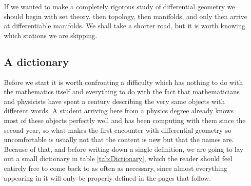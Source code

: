     If we wanted to make a completely rigorous study of differential geometry we should begin with set theory, then topology, then manifolds, and only then arrive at differentiable manifolds. We shall take a shorter road, but it is worth knowing which stations we are skipping.

    \subsection{A dictionary}

        Before we start it is worth confronting a difficulty which has nothing to do with the mathematics itself and everything to do with the fact that mathematicians and physicists have spent a century describing the very same objects with different words. A student arriving here from a physics degree already knows most of these objects perfectly well and has been computing with them since the second year, so what makes the first encounter with differential geometry so uncomfortable is usually not that the content is new but that the names are. Because of that, and before writing down a single definition, we are going to lay out a small dictionary in table \ref{tab:Dictionary}, which the reader should feel entirely free to come back to as often as necessary, since almost everything appearing in it will only be properly defined in the pages that follow.

